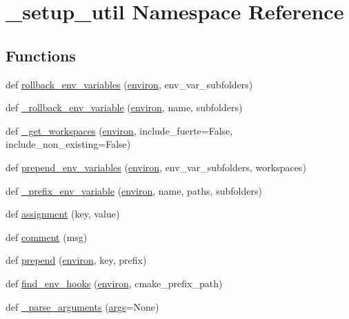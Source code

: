\hypertarget{namespace__setup__util}{}\section{\+\_\+setup\+\_\+util Namespace Reference}
\label{namespace__setup__util}
\subsection*{Functions}
\begin{DoxyCompactItemize}
\item 
def \hyperlink{namespace__setup__util_af3030db6102b5aa35cd354a2fb6cca03}{rollback\+\_\+env\+\_\+variables} (\hyperlink{namespace__setup__util_a9a935bdd9ee1aa0327161025bb18c136}{environ}, env\+\_\+var\+\_\+subfolders)
\item 
def \hyperlink{namespace__setup__util_af05661e87b3270e8bfd0fbc18a5eeec4}{\+\_\+rollback\+\_\+env\+\_\+variable} (\hyperlink{namespace__setup__util_a9a935bdd9ee1aa0327161025bb18c136}{environ}, name, subfolders)
\item 
def \hyperlink{namespace__setup__util_ab2be07aa31918f1e1e34d6b7c4d66fcb}{\+\_\+get\+\_\+workspaces} (\hyperlink{namespace__setup__util_a9a935bdd9ee1aa0327161025bb18c136}{environ}, include\+\_\+fuerte=False, include\+\_\+non\+\_\+existing=False)
\item 
def \hyperlink{namespace__setup__util_a832417d18b85bd1d276a87547e86f860}{prepend\+\_\+env\+\_\+variables} (\hyperlink{namespace__setup__util_a9a935bdd9ee1aa0327161025bb18c136}{environ}, env\+\_\+var\+\_\+subfolders, workspaces)
\item 
def \hyperlink{namespace__setup__util_a74a1f8575ed82282d03f7795c9ba6e45}{\+\_\+prefix\+\_\+env\+\_\+variable} (\hyperlink{namespace__setup__util_a9a935bdd9ee1aa0327161025bb18c136}{environ}, name, paths, subfolders)
\item 
def \hyperlink{namespace__setup__util_ad56c24837fa4eddc63c03fbc7035628f}{assignment} (key, value)
\item 
def \hyperlink{namespace__setup__util_abe8c95c4cfe8b1374dacd5f91d984353}{comment} (msg)
\item 
def \hyperlink{namespace__setup__util_ae78d86b2c4279f5b8b1acaa146c35802}{prepend} (\hyperlink{namespace__setup__util_a9a935bdd9ee1aa0327161025bb18c136}{environ}, key, prefix)
\item 
def \hyperlink{namespace__setup__util_a73de35ca77f260af6691470342ab49ce}{find\+\_\+env\+\_\+hooks} (\hyperlink{namespace__setup__util_a9a935bdd9ee1aa0327161025bb18c136}{environ}, cmake\+\_\+prefix\+\_\+path)
\item 
def \hyperlink{namespace__setup__util_a57d9ecb280810c9a5409d44aeb9d0a25}{\+\_\+parse\+\_\+arguments} (\hyperlink{namespace__setup__util_a547963d07c6371df1c51b1384a2dec28}{args}=None)
\end{DoxyCompactItemize}
